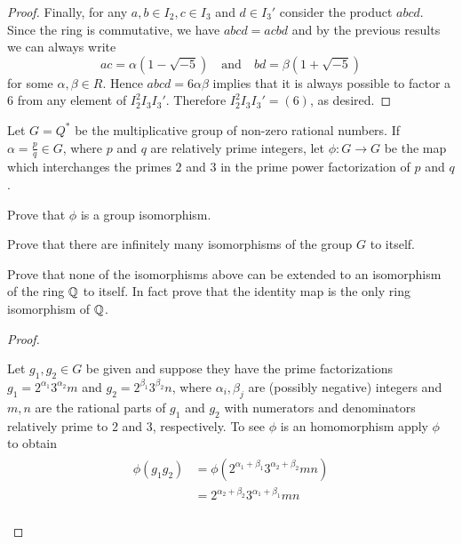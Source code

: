 \documentclass[10pt]{amsart}
\begin{document}
\begin{thm}
\begin{proof}
    Finally, for any \(a,b \in I_2, c \in I_3\) and \(d \in I_3'\) consider the product \(abcd\).
    Since the ring is commutative, we have \(abcd = acbd\) and by the previous results we can always write \[ac = \alpha(1 - \sqrt{-5}) \quad \text{and} \quad bd = \beta(1 + \sqrt{-5})\] for some \(\alpha, \beta \in R\).
    Hence \(abcd = 6\alpha\beta\) implies that it is always possible to factor a \(6\) from any element of \(I_2^2I_3I_3'\).
    Therefore \(I_2^2I_3I_3' = (6)\), as desired.
  \end{proof}
\end{thm}

\begin{thm}
  \label{Ex2}
  Let $G = Q^*$ be the multiplicative group of non-zero rational numbers.  
  If $\alpha = \frac{p}{q} \in G$, where $p$ and $q$ are relatively prime integers, let $\phi: G \longrightarrow G$ be the map which interchanges the primes $2$ and $3$ in the prime power factorization of $p$ and $q$.
  \begin{alphaenum}
  \item Prove that $\phi$ is a group isomorphism.
  \item Prove that there are infinitely many isomorphisms of the group $G$ to itself.
  \item Prove that none of the isomorphisms above can be extended to an isomorphism of the ring $\mathbb{Q}$ to itself. In fact prove that the identity map is the only ring isomorphism of $\mathbb{Q}$.
  \end{alphaenum}
  \begin{proof}
    \begin{alphaenum}
    \item
      Let $g_1,g_2 \in G$ be given and suppose they have the prime factorizations $g_1 = 2^{\alpha_1}3^{\alpha_2}m$ and $g_2 = 2^{\beta_1}3^{\beta_2}n$, where $\alpha_i, \beta_j$ are (possibly negative) integers and $m, n$ are the rational parts of $g_1$ and $g_2$ with numerators and denominators relatively prime to 2 and 3, respectively.
      To see $\phi$ is an homomorphism apply $\phi$ to obtain
      \begin{align*}
        \begin{split}
          \phi(g_1g_2) &= \phi(2^{\alpha_1+\beta_1}3^{\alpha_2+\beta_2}mn)\\
          &= 2^{\alpha_2+\beta_2}3^{\alpha_1+\beta_1}mn\\

\end{split}
\end{align*}
\end{alphaenum}
\end{proof}
\end{thm}
\end{document}
